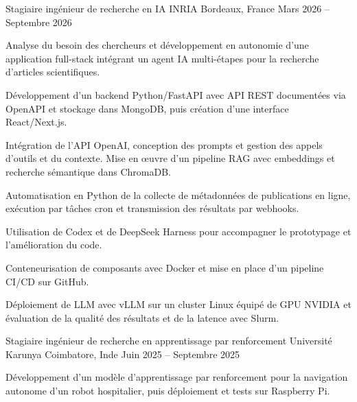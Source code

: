 
\begin{cventries}
  \cventry
    {Stagiaire ingénieur de recherche en IA}
    {INRIA}
    {Bordeaux, France}
    {Mars 2026 -- Septembre 2026}
    {
      \begin{cvitems}
        \item {Analyse du besoin des chercheurs et développement en autonomie d’une application full-stack intégrant un agent IA multi-étapes pour la recherche d’articles scientifiques.}
        \item {Développement d’un backend Python/FastAPI avec API REST documentées via OpenAPI et stockage dans MongoDB, puis création d’une interface React/Next.js.}
        \item {Intégration de l’API OpenAI, conception des prompts et gestion des appels d’outils et du contexte. Mise en œuvre d’un pipeline RAG avec embeddings et recherche sémantique dans ChromaDB.}
        \item {Automatisation en Python de la collecte de métadonnées de publications en ligne, exécution par tâches cron et transmission des résultats par webhooks.}
        \item {Utilisation de Codex et de DeepSeek Harness pour accompagner le prototypage et l’amélioration du code.}
        \item {Conteneurisation de composants avec Docker et mise en place d’un pipeline CI/CD sur GitHub.}
        \item {Déploiement de LLM avec vLLM sur un cluster Linux équipé de GPU NVIDIA et évaluation de la qualité des résultats et de la latence avec Slurm.}
      \end{cvitems}
    }

  \cventry
    {Stagiaire ingénieur de recherche en apprentissage par renforcement}
    {Université Karunya}
    {Coimbatore, Inde}
    {Juin 2025 -- Septembre 2025}
    {
      \begin{cvitems}
        \item {Développement d’un modèle d’apprentissage par renforcement pour la navigation autonome d’un robot hospitalier, puis déploiement et tests sur Raspberry Pi.}
      \end{cvitems}
    }
\end{cventries}
